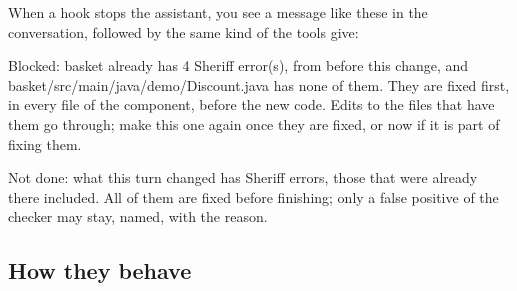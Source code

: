 \documentclass[11pt,a4paper]{article}
\begin{document}
When a hook stops the assistant, you see a message like these in the
conversation, followed by the same kind of  the tools give:

\begin{answer}[Gate]
Blocked: basket already has 4 Sheriff error(s), from before this change, and basket/src/main/java/demo/Discount.java
has none of them. They are fixed first, in every file of the component, before the
new code. Edits to the files that have them go through; make this one again once
they are fixed, or now if it is part of fixing them.
\end{answer}

\begin{answer}[Stop]
Not done: what this turn changed has Sheriff errors, those that were already there
included. All of them are fixed before finishing; only a false positive of the checker
may stay, named, with the reason.
\end{answer}

\subsection{How they behave}
\end{document}
